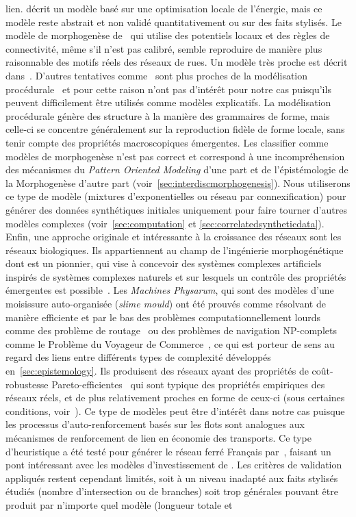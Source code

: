 {lien. \cite{barthelemy2008modeling} décrit un modèle basé sur une optimisation locale de l'énergie, mais ce modèle reste abstrait et non validé quantitativement ou sur des faits stylisés. Le modèle de morphogenèse de~\cite{courtat2011mathematics} qui utilise des potentiels locaux et des règles de connectivité, même s'il n'est pas calibré, semble reproduire de manière plus raisonnable des motifs réels des réseaux de rues. Un modèle très proche est décrit dans~\cite{rui2013exploring}. D'autres tentatives comme~\cite{de2007netlogo,yamins2003growing} sont plus proches de la modélisation procédurale~\cite{lechner2004procedural,watson2008procedural} et pour cette raison n'ont pas d'intérêt pour notre cas puisqu'ils peuvent difficilement être utilisés comme modèles explicatifs. La modélisation procédurale génère des structure à la manière des grammaires de forme, mais celle-ci se concentre généralement sur la reproduction fidèle de forme locale, sans tenir compte des propriétés macroscopiques émergentes. Les classifier comme modèles de morphogenèse n'est pas correct et correspond à une incompréhension des mécanismes du \emph{Pattern Oriented Modeling} d'une part et de l'épistémologie de la Morphogenèse d'autre part (voir~\ref{sec:interdiscmorphogenesis}). Nous utiliserons ce type de modèle (mixtures d'exponentielles ou réseau par connexification) pour générer des données synthétiques initiales uniquement pour faire tourner d'autres modèles complexes (voir~\ref{sec:computation} et \ref{sec:correlatedsyntheticdata}). Enfin, une approche originale et intéressante à la croissance des réseaux sont les réseaux biologiques. Ils appartiennent au champ de l'ingénierie morphogénétique dont  est un pionnier, qui vise à concevoir des systèmes complexes artificiels inspirés de systèmes complexes naturels et sur lesquels un contrôle des propriétés émergentes est possible~\cite{doursat2012morphogenetic}. Les \emph{Machines Physarum}, qui sont des modèles d'une moisissure auto-organisée (\emph{slime mould}) ont été prouvés comme résolvant de manière efficiente et par le bas des problèmes computationnellement lourds comme des problème de routage~\cite{tero2006physarum} ou des problèmes de navigation NP-complets comme le Problème du Voyageur de Commerce~\cite{zhu2013amoeba}, ce qui est porteur de sens au regard des liens entre différents types de complexité développés en~\ref{sec:epistemology}. Ils produisent des réseaux ayant des propriétés de coût-robustesse Pareto-efficientes~\cite{tero2010rules} qui sont typique des propriétés empiriques des réseaux réels, et de plus relativement proches en forme de ceux-ci (sous certaines conditions, voir~\cite{adamatzky2010road}). Ce type de modèles peut être d'intérêt dans notre cas puisque les processus d'auto-renforcement basés sur les flots sont analogues aux mécanismes de renforcement de lien en économie des transports. Ce type d'heuristique a été testé pour générer le réseau ferré Français par~\cite{mimeur:tel-01451164}, faisant un pont intéressant avec les modèles d'investissement de . Les critères de validation appliqués restent cependant limités, soit à un niveau inadapté aux faits stylisés étudiés (nombre d'intersection ou de branches) soit trop générales pouvant être produit par n'importe quel modèle (longueur totale et }
